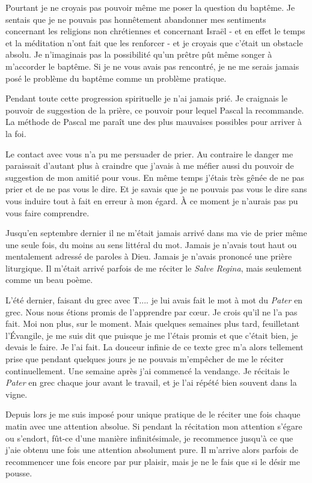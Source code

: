 \documentclass[french,twoside]{book} %
\begin{document}
Pourtant je ne croyais pas pouvoir même me poser la question du baptême. Je sentais que je ne pouvais pas honnêtement abandonner mes sentiments concernant les religions non chrétiennes et concernant Israël - et en effet le temps et la méditation n'ont fait que les renforcer - et je croyais que c'était un obstacle absolu. Je n'imaginais pas la possibilité qu'un prêtre pût même songer à m'accorder le baptême. Si je ne vous avais pas rencontré, je ne me serais jamais posé le problème du baptême comme un problème pratique.\par
Pendant toute cette progression spirituelle je n'ai jamais prié. Je craignais le pouvoir de suggestion de la prière, ce pouvoir pour lequel Pascal la recommande. La méthode de Pascal me paraît une des plus mauvaises possibles pour arriver à la foi.\par
Le contact avec vous n'a pu me persuader de prier. Au contraire le danger me paraissait d'autant plus à craindre que j'avais à me méfier aussi du pouvoir de suggestion de mon amitié pour vous. En même temps j'étais très gênée de ne pas prier et de ne pas vous le dire. Et je savais que je ne pouvais pas vous le dire sans vous induire tout à fait en erreur à mon égard. À ce moment je n'aurais pas pu vous faire comprendre.\par
Jusqu'en septembre dernier il ne m'était jamais arrivé dans ma vie de prier même une seule fois, du moins au sens littéral du mot. Jamais je n'avais tout haut ou mentalement adressé de paroles à Dieu. Jamais je n'avais prononcé une prière liturgique. Il m'était arrivé parfois de me réciter le {\itshape Salve Regina}, mais seulement comme un beau poème.\par
L'été dernier, faisant du grec avec T.... je lui avais fait le mot à mot du {\itshape Pater} en grec. Nous nous étions promis de l'apprendre par cœur. Je crois qu'il ne l'a pas fait. Moi non plus, sur le moment. Mais quelques semaines plus tard, feuilletant l'Évangile, je me suis dit que puisque je me l'étais promis et que c'était bien, je devais le faire. Je l'ai fait. La douceur infinie de ce texte grec m'a alors tellement prise que pendant quelques jours je ne pouvais m'empêcher de me le réciter continuellement. Une semaine après j'ai commencé la vendange. Je récitais le {\itshape Pater} en grec chaque jour avant le travail, et je l'ai répété bien souvent dans la vigne.\par
Depuis lors je me suis imposé pour unique pratique de le réciter une fois chaque matin avec une attention absolue. Si pendant la récitation mon attention s'égare ou s'endort, fût-ce d'une manière infinitésimale, je recommence jusqu'à ce que j'aie obtenu une fois une attention absolument pure. Il m'arrive alors parfois de recommencer une fois encore par pur plaisir, mais je ne le fais que si le désir me pousse.\par
\end{document}
